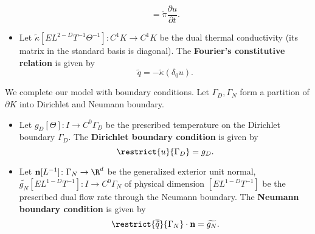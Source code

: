 \begin{discussion}
\begin{itemize}
\begin{equation}
        = \tilde{\pi} \frac{\partial u}{\partial t}.
      \end{equation}
    \item
      Let
      $\tilde{\kappa} [E L^{2 - D} T^{-1} \Theta^{-1}] \colon C^1 K \to C^1 K$
      be the dual thermal conductivity
      (its matrix in the standard basis is diagonal).
      The \textbf{Fourier's constitutive relation} is given by
      \begin{equation}
        \tilde{q} = - \tilde{\kappa} (\delta_0 u).
      \end{equation}
  \end{itemize}
  We complete our model with boundary conditions.
  Let $\Gamma_D, \Gamma_N$ form a partition of $\partial K$
  into Dirichlet and Neumann boundary.
  \begin{itemize}
    \item
      Let $g_D [\Theta] \colon I \to C^0 \Gamma_D$
      be the prescribed temperature on the Dirichlet boundary $\Gamma_D$.
      The \textbf{Dirichlet boundary condition} is given by
      \begin{equation}
        \restrict{u}{\Gamma_D} = g_D.
      \end{equation}
    \item
      Let
        ${\bf n} [L^{-1}] \colon \Gamma_N \to \R^d$
          be the generalized exterior unit normal,
        $\widetilde{g_N} [E L^{1 - D} T^{-1}] \colon I \to C^0 \Gamma_N$
          of physical dimension $[E L^{1 - D} T^{-1}]$
          be the prescribed dual flow rate through the Neumann boundary.
      The \textbf{Neumann boundary condition} is given by
      \begin{equation}
        \restrict{\overline{\tilde{q}}}{\Gamma_N} \cdot {\bf n}
        = \widetilde{g_N}.
      \end{equation}
  \end{itemize}
\end{discussion}
